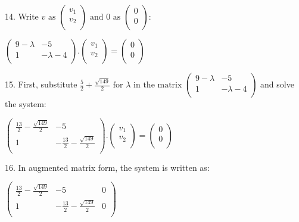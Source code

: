\documentclass{article}
\begin{document}
14. Write $v\text{ as }\left(
\begin{array}{c}
v_1 \\
 v_2 \\
\end{array}
\right)\text{ and }0\text{ as }\left(
\begin{array}{c}
0 \\
 0 \\
\end{array}
\right):$

$\left(
\begin{array}{cc}
9-\lambda  & -5 \\
 1 & -\lambda -4 \\
\end{array}
\right).\left(
\begin{array}{c}
v_1 \\
 v_2 \\
\end{array}
\right)=\left(
\begin{array}{c}
0 \\
 0 \\
\end{array}
\right)$

15. First, substitute $\frac{5}{2}+\frac{\sqrt{149}}{2}\text{ for }\lambda\text{  in the matrix }\left(
\begin{array}{cc}
9-\lambda  & -5 \\
 1 & -\lambda -4 \\
\end{array}
\right)$ and solve the system:

$\left(
\begin{array}{cc}
\frac{13}{2}-\frac{\sqrt{149}}{2} & -5 \\
 1 & -\frac{13}{2}-\frac{\sqrt{149}}{2} \\
\end{array}
\right).\left(
\begin{array}{c}
v_1 \\
 v_2 \\
\end{array}
\right)=\left(
\begin{array}{c}
0 \\
 0 \\
\end{array}
\right)$

16. In augmented matrix form, the system is written as:

$\left(
\begin{array}{ccc}
\frac{13}{2}-\frac{\sqrt{149}}{2} & -5 & 0 \\
 1 & -\frac{13}{2}-\frac{\sqrt{149}}{2} & 0 \\
\end{array}
\right)$
\end{document}
